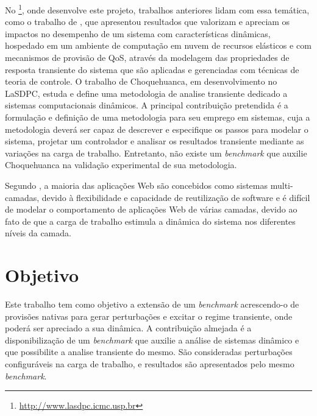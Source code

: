 No \textit{}\footnote{\url{http://www.lasdpc.icmc.usp.br}}, onde desenvolve este projeto, trabalhos anteriores lidam com essa temática, como o trabalho de \cite{Nobile2013}, que apresentou resultados que valorizam e apreciam os impactos no desempenho de um sistema com características dinâmicas, hospedado em um ambiente de computação em nuvem de recursos elásticos e com mecanismos de provisão de QoS, através da modelagem das propriedades de resposta transiente do sistema que são aplicadas e gerenciadas com  técnicas de teoria de controle. O trabalho de Choquehuanca, em desenvolvimento no LaSDPC, estuda e define uma metodologia de analise transiente dedicado a sistemas computacionais dinâmicos. A principal contribuição pretendida é a formulação e definição de uma metodologia para seu emprego em sistemas, cuja a metodologia deverá ser capaz de descrever e especifique os passos para modelar o sistema, projetar um controlador e analisar os resultados transiente mediante as variações na carga de trabalho. Entretanto, não existe um \textit{benchmark} que auxilie Choquehuanca na validação experimental de sua metodologia.

Segundo \cite{Dong2014}, a maioria das aplicações Web são concebidos como sistemas multi-camadas, devido à flexibilidade e capacidade de reutilização de software e é difícil de modelar o comportamento de aplicações Web de várias camadas, devido ao fato de que a carga de trabalho estimula a dinâmica do sistema nos diferentes níveis da camada.


\section{Objetivo}
Este trabalho tem como objetivo a extensão de um \textit{benchmark} acrescendo-o de provisões nativas para gerar perturbações e excitar o regime transiente, onde poderá ser apreciado a sua dinâmica.  A contribuição almejada é a disponibilização de um \textit{benchmark} que auxilie a análise de sistemas dinâmico e que possibilite a analise transiente do mesmo. São consideradas perturbações configuráveis na carga de trabalho, e resultados são apresentados pelo mesmo \textit{benchmark}.
